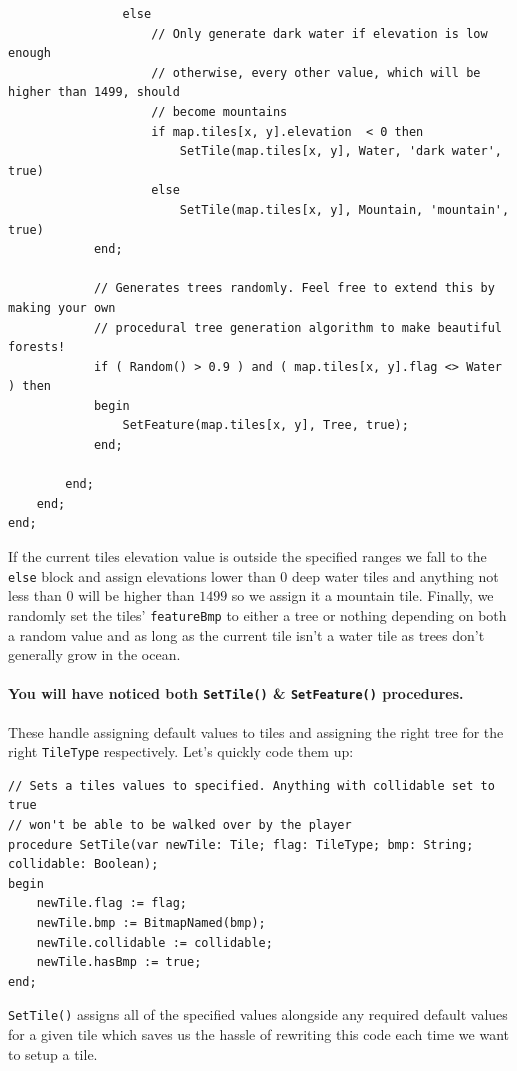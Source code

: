 \documentclass{article}
\begin{document}
\begin{verbatim}
				else
					// Only generate dark water if elevation is low enough
					// otherwise, every other value, which will be higher than 1499, should
					// become mountains
					if map.tiles[x, y].elevation  < 0 then
						SetTile(map.tiles[x, y], Water, 'dark water', true)
					else
						SetTile(map.tiles[x, y], Mountain, 'mountain', true)
			end;

			// Generates trees randomly. Feel free to extend this by making your own
			// procedural tree generation algorithm to make beautiful forests!
			if ( Random() > 0.9 ) and ( map.tiles[x, y].flag <> Water ) then
			begin
				SetFeature(map.tiles[x, y], Tree, true);
			end;

		end;
	end;
end;
\end{verbatim}

If the current tiles elevation value is outside the specified ranges we fall to the \texttt{else} block and assign elevations lower than $0$ deep water tiles and anything not less than $0$ will be higher than $1499$ so we assign it a mountain tile. Finally, we randomly set the tiles' \texttt{featureBmp} to either a tree or nothing depending on both a random value and as long as the current tile isn't a water tile as trees don't generally grow in the ocean.

\paragraph{You will have noticed both \texttt{SetTile()} \& \texttt{SetFeature()} procedures.} These handle assigning default values to tiles and assigning the right tree for the right \texttt{TileType} respectively. Let's quickly code them up:

\begin{verbatim}
// Sets a tiles values to specified. Anything with collidable set to true
// won't be able to be walked over by the player
procedure SetTile(var newTile: Tile; flag: TileType; bmp: String; collidable: Boolean);
begin
	newTile.flag := flag;
	newTile.bmp := BitmapNamed(bmp);
	newTile.collidable := collidable;
	newTile.hasBmp := true;
end;
\end{verbatim}

\texttt{SetTile()} assigns all of the specified values alongside any required default values for a given tile which saves us the hassle of rewriting this code each time we want to setup a tile.
\end{document}
